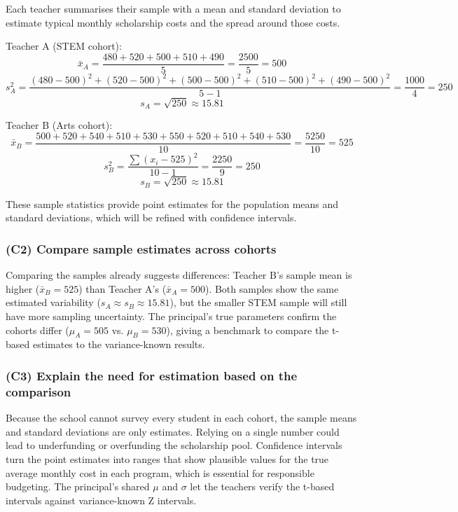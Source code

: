 Each teacher summarises their sample with a mean and standard deviation to estimate typical monthly scholarship costs and the spread around those costs.

Teacher A (STEM cohort):
\[
\bar{x}_A = \frac{480 + 520 + 500 + 510 + 490}{5} = \frac{2500}{5} = 500
\]
\[
 s_A^2 = \frac{(480-500)^2 + (520-500)^2 + (500-500)^2 + (510-500)^2 + (490-500)^2}{5-1}
= \frac{1000}{4} = 250
\]
\[
 s_A = \sqrt{250} \approx 15.81
\]

Teacher B (Arts cohort):
\[
\bar{x}_B = \frac{500 + 520 + 540 + 510 + 530 + 550 + 520 + 510 + 540 + 530}{10}
= \frac{5250}{10} = 525
\]
\[
 s_B^2 = \frac{\sum (x_i - 525)^2}{10-1}
= \frac{2250}{9} = 250
\]
\[
 s_B = \sqrt{250} \approx 15.81
\]

These sample statistics provide point estimates for the population means and standard deviations, which will be refined with confidence intervals.

\subsubsection{(C2) Compare sample estimates across cohorts}\label{subsubsec:interval-example1-1-c2}

Comparing the samples already suggests differences: Teacher B's sample mean is higher (\(\bar{x}_B = 525\)) than Teacher A's (\(\bar{x}_A = 500\)). Both samples show the same estimated variability (\(s_A \approx s_B \approx 15.81\)), but the smaller STEM sample will still have more sampling uncertainty. The principal's true parameters confirm the cohorts differ (\(\mu_A = 505\) vs. \(\mu_B = 530\)), giving a benchmark to compare the t-based estimates to the variance-known results.

\subsubsection{(C3) Explain the need for estimation based on the comparison}\label{subsubsec:interval-example1-1-c3}

Because the school cannot survey every student in each cohort, the sample means and standard deviations are only estimates. Relying on a single number could lead to underfunding or overfunding the scholarship pool. Confidence intervals turn the point estimates into ranges that show plausible values for the true average monthly cost in each program, which is essential for responsible budgeting. The principal's shared \(\mu\) and \(\sigma\) let the teachers verify the t-based intervals against variance-known Z intervals.

